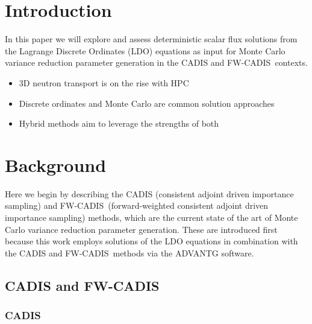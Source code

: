 \documentclass{article} %
\newcommand{\fwc}{\mbox{FW-CADIS}}
\begin{document}
\pagebreak

\begin{abstract}
{
abstract

Keywords: x; y; z
}
\end{abstract}

\pagebreak


\section{Introduction}
\label{sec:intro}

In this paper we will explore and assess deterministic scalar flux solutions
from the Lagrange Discrete Ordinates (LDO) equations as input for Monte Carlo
variance reduction parameter generation in the CADIS and \fwc\ contexts.

\begin{itemize}
\item{3D neutron transport is on the rise with HPC}
\item{Discrete ordinates and Monte Carlo are common solution approaches}
\item{Hybrid methods aim to leverage the strengths of both}
\end{itemize}

\section{Background}
\label{sec:background}

Here we begin by describing the CADIS (consistent adjoint driven importance 
sampling) and \fwc\ (forward-weighted consistent adjoint driven importance
sampling) methods, which are the current state
of the art of Monte Carlo variance reduction parameter generation. These are 
introduced first because this work 
employs solutions of the LDO equations in combination with the CADIS and \fwc\ 
methods via the ADVANTG software.

\subsection{CADIS and \fwc}

\subsubsection{CADIS}
\end{document}
